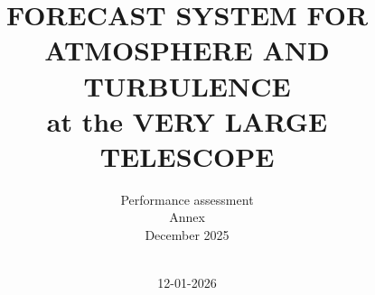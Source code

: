 \documentclass[a4paper]{article}
\title{FORECAST SYSTEM FOR ATMOSPHERE AND TURBULENCE\\
at the VERY LARGE TELESCOPE}
\author{
\vspace{1.0cm}
\begin{minipage}{9.5cm}
\begin{center}
\LARGE{Performance assessment}\\
\LARGE{Annex}\\
\LARGE{December 2025}
\end{center}
\end{minipage}\\
\vspace{3cm}
}
\date{12-01-2026}
\begin{document}
 
\maketitle 


\contents     %







\end{document}
